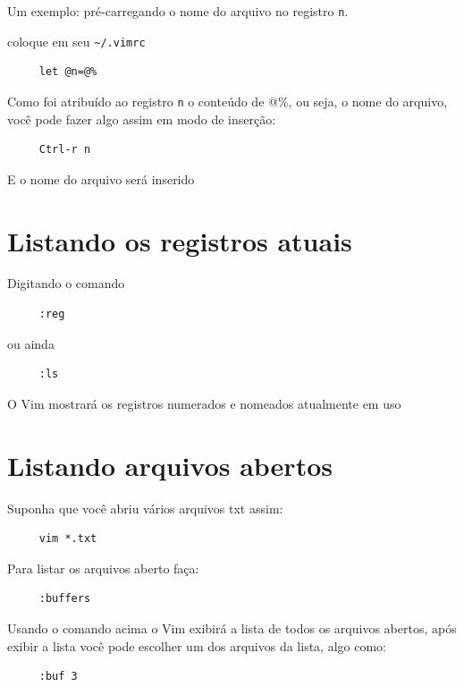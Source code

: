 \documentclass[10pt,a4paper,openany]{book}
\begin{document}
Um exemplo: pré-carregando o nome do arquivo no registro \verb+n+.

coloque em seu \verb+~/.vimrc+

\begin{verbatim}
     let @n=@%
\end{verbatim}

Como foi atribuído ao registro \verb+n+ o conteúdo de @\%, ou seja, o nome
do arquivo, você pode fazer algo assim em modo de inserção:

\begin{verbatim}
     Ctrl-r n
\end{verbatim}

E o nome do arquivo será inserido

\section{Listando os registros atuais}
\label{Listando os registros atuais}
Digitando o comando

\begin{verbatim}
     :reg
\end{verbatim}

ou ainda

\begin{verbatim}
     :ls
\end{verbatim}

O Vim mostrará os registros numerados e nomeados atualmente em uso

\section{Listando arquivos abertos}
\label{Listando arquivos abertos}
Suponha que você abriu vários arquivos txt assim:

\begin{verbatim}
     vim *.txt
\end{verbatim}

Para listar os arquivos aberto faça:

\begin{verbatim}
     :buffers
\end{verbatim}

Usando o comando acima o Vim exibirá a lista de todos os arquivos
abertos, após exibir a lista você pode escolher um dos arquivos da
lista, algo como:

\begin{verbatim}
     :buf 3
\end{verbatim}
\end{document}
